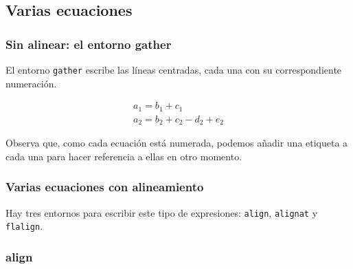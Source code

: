 \documentclass{article}
\numberwithin{equation}{section}
\theoremstyle{plain}
\theoremstyle{definition}
\theoremstyle{remark}
\begin{document}
\subsection{Varias ecuaciones}

\subsubsection*{Sin alinear: el entorno gather}

El entorno \texttt{gather} escribe las líneas centradas, cada una con su correspondiente numeración.
\begin{codigo-lado}
\begin{gather}
a_1 = b_1 + c_1 \label{eq:gather1}\\
a_2 = b_2 + c_2 - d_2 + e_2 \label{eq:gather2}
\end{gather}
\end{codigo-lado}
Observa que, como cada ecuación está numerada, podemos añadir una etiqueta a cada una para hacer referencia a ellas en otro momento.

\subsubsection*{Varias ecuaciones con alineamiento}

Hay tres entornos para escribir este tipo de expresiones: \texttt{align}, \texttt{alignat} y \texttt{flalign}. 

\subsubsection*{align}
\end{document}
